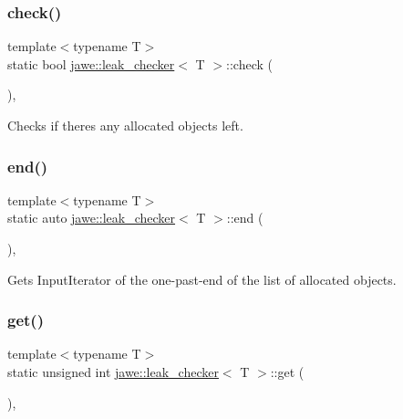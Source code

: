 \subsubsection{\texorpdfstring{check()}{check()}}
{\footnotesize\ttfamily template$<$typename T$>$ \\
static bool \hyperlink{classjawe_1_1leak__checker}{jawe\+::leak\+\_\+checker}$<$ T $>$\+::check (\begin{DoxyParamCaption}{ }\end{DoxyParamCaption})\hspace{0.3cm}{\ttfamily [inline]}, {\ttfamily [static]}}

Checks if there\textquotesingle{}s any allocated objects left. \mbox{\label{classjawe_1_1leak__checker_a851cc284fe5cafb4a65c397c232f1d62}} 
\subsubsection{\texorpdfstring{end()}{end()}}
{\footnotesize\ttfamily template$<$typename T$>$ \\
static auto \hyperlink{classjawe_1_1leak__checker}{jawe\+::leak\+\_\+checker}$<$ T $>$\+::end (\begin{DoxyParamCaption}{ }\end{DoxyParamCaption})\hspace{0.3cm}{\ttfamily [inline]}, {\ttfamily [static]}}

Gets Input\+Iterator of the one-\/past-\/end of the list of allocated objects. \mbox{\label{classjawe_1_1leak__checker_ab8907095d59ba69847722593aca9010f}} 
\subsubsection{\texorpdfstring{get()}{get()}}
{\footnotesize\ttfamily template$<$typename T$>$ \\
static unsigned int \hyperlink{classjawe_1_1leak__checker}{jawe\+::leak\+\_\+checker}$<$ T $>$\+::get (\begin{DoxyParamCaption}{ }\end{DoxyParamCaption})\hspace{0.3cm}{\ttfamily [inline]}, {\ttfamily [static]}}

